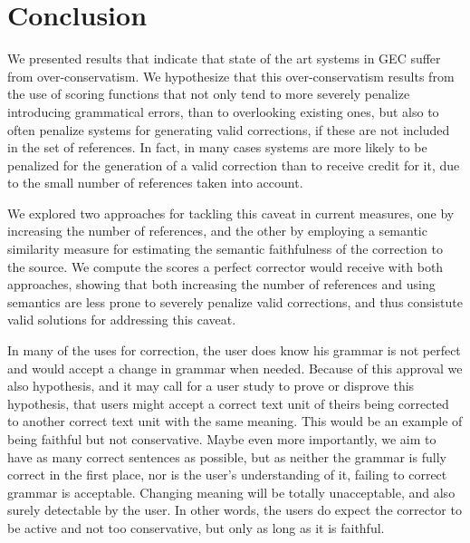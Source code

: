 \documentclass[letter,11pt]{article}
\begin{document}
\section{Conclusion}

We presented results that indicate that state of the art systems in GEC suffer from
over-conservatism. We hypothesize that this over-conservatism results from the use
of scoring functions that not only tend to more severely penalize introducing
grammatical errors, than to overlooking existing ones, but also to often penalize
systems for generating valid corrections, if these are not included in the set of references.
In fact, in many cases systems are more likely to be penalized for the generation of
a valid correction than to receive credit for it, due to the small number of references
taken into account.

We explored two approaches for tackling this caveat in current measures, one by
increasing the number of references, and the other by employing a semantic similarity
measure for estimating the semantic faithfulness of the correction to the source.
We compute the scores a perfect corrector would receive with both approaches, showing
that both increasing the number of references and using semantics 
are less prone to severely
penalize valid corrections, and thus consistute valid solutions for addressing this caveat.

In many of the uses for correction, the user does know his grammar
is not perfect and would accept a change in grammar when needed.
Because of this approval we also
hypothesis, and it may call for a user study to prove or disprove
this hypothesis, that users might accept a correct text unit of theirs
being corrected to another correct text unit with the same meaning.
This would be an example of being faithful but not conservative.
Maybe even more importantly, we aim to have as many correct sentences
as possible, but as neither the grammar is fully correct in the first place,
nor is the user's understanding of it, failing to correct grammar
is acceptable. Changing meaning will be totally unacceptable, and
also surely detectable by the user. In other words, the users do expect
the corrector to be active and not too conservative, but
only as long as it is faithful. 
\end{document}
